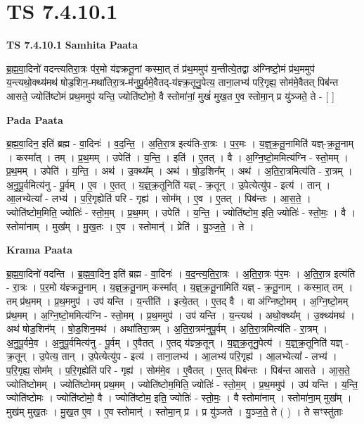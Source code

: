 \documentclass[17pt]{extarticle}
\begin{document}
\section{ TS 7.4.10.1 }

\textbf{TS 7.4.10.1 } \newline
\textbf{Samhita Paata} \newline

ब्र॒ह्म॒वा॒दिनो॑ वदन्त्यतिरा॒त्रः प॑र॒मो य॑ज्ञ्क्रतू॒नां कस्मा॒त् तं प्र॑थ॒ममुप॑ य॒न्तीत्ये॒तद्वा अ॑ग्निष्टो॒मं प्र॑थ॒ममुप॑ य॒न्त्यथो॒क्थ्य॑मथ॑ षोड॒शिन॒-मथा॑तिरा॒त्र-म॑नुपू॒र्वमे॒वैतद्-य॑ज्ञ्क्र॒तूनु॒पेत्य॒ ताना॒लभ्य॑ परि॒गृह्य॒ सोम॑मे॒वैतत् पिब॑न्त आसते॒ ज्योति॑ष्टोमं प्रथ॒ममुप॑ यन्ति॒ ज्योति॑ष्टोमो॒ वै स्तोमा॑नां॒ मुखं॑ मुख॒त ए॒व स्तोमा॒न् प्र यु॑ञ्जते॒ ते - [  ] \newline

\textbf{Pada Paata} \newline

ब्र॒ह्म॒वा॒दिन॒ इति॑ ब्रह्म - वा॒दिनः॑ । व॒द॒न्ति॒ । अ॒ति॒रा॒त्र इत्य॑ति-रा॒त्रः । प॒र॒मः । य॒ज्ञ्॒क्र॒तू॒नामिति॑ यज्ञ्-क्र॒तू॒नाम् । कस्मा᳚त् । तम् । प्र॒थ॒मम् । उपेति॑ । य॒न्ति॒ । इति॑ । ए॒तत् । वै । अ॒ग्नि॒ष्टो॒ममित्य॑ग्नि - स्तो॒मम् । प्र॒थ॒मम् । उपेति॑ । य॒न्ति॒ । अथ॑ । उ॒क्थ्य᳚म् । अथ॑ । षो॒ड॒शिन᳚म् । अथ॑ । अ॒ति॒रा॒त्रमित्य॑ति - रा॒त्रम् । अ॒नु॒पू॒र्वमित्य॑नु - पू॒र्वम् । ए॒व । ए॒तत् । य॒ज्ञ्॒क्र॒तूनिति॑ यज्ञ् - क्र॒तून् । उ॒पेत्येत्यु॑प - इत्य॑ । तान् । आ॒लभ्येत्या᳚ - लभ्य॑ । प॒रि॒गृह्येति॑ परि - गृह्य॑ । सोम᳚म् । ए॒व । ए॒तत् । पिब॑न्तः । आ॒स॒ते॒ । ज्योति॑ष्टोम॒मिति॒ ज्योतिः॑ - स्तो॒म॒म् । प्र॒थ॒मम् । उपेति॑ । य॒न्ति॒ । ज्योति॑ष्टोम॒ इति॒ ज्योतिः॑ - स्तो॒मः॒ । वै । स्तोमा॑नाम् । मुख᳚म् । मु॒ख॒तः । ए॒व । स्तोमान्॑ । प्रेति॑ । यु॒ञ्ज॒ते॒ । ते ।  \newline


\textbf{Krama Paata} \newline

ब्र॒ह्म॒वा॒दिनो॑ वदन्ति । ब्र॒ह्म॒वा॒दिन॒ इति॑ ब्रह्म - वा॒दिनः॑ । व॒द॒न्त्य॒ति॒रा॒त्रः । अ॒ति॒रा॒त्रः प॑र॒मः । अ॒ति॒रा॒त्र इत्य॑ति - रा॒त्रः । प॒र॒मो य॑ज्ञ्क्रतू॒नाम् । य॒ज्ञ्॒क्र॒तू॒नाम् कस्मा᳚त् । य॒ज्ञ्॒क्र॒तू॒नामिति॑ यज्ञ् - क्र॒तू॒नाम् । कस्मा॒त् तम् । तम् प्र॑थ॒मम् । प्र॒थ॒ममुप॑ । उप॑ यन्ति । य॒न्तीति॑ । इत्ये॒तत् । ए॒तद् वै । वा अ॑ग्निष्टो॒मम् । अ॒ग्नि॒ष्टो॒मम् प्र॑थ॒मम् । अ॒ग्नि॒ष्टो॒ममित्य॑ग्नि - स्तो॒मम् । प्र॒थ॒ममुप॑ । उप॑ यन्ति । य॒न्त्यथ॑ । अथो॒क्थ्य᳚म् । उ॒क्थ्य॑मथ॑ । अथ॑ षोड॒शिन᳚म् । षो॒ड॒शिन॒मथ॑ । अथा॑तिरा॒त्रम् । अ॒ति॒रा॒त्रम॑नुपू॒र्वम् । अ॒ति॒रा॒त्रमित्य॑ति - रा॒त्रम् । अ॒नु॒पू॒र्वमे॒व । अ॒नु॒पू॒र्वमित्य॑नु - पू॒र्वम् । ए॒वैतत् । ए॒तद् य॑ज्ञ्क्र॒तून् । य॒ज्ञ्॒क्र॒तूनु॒पेत्य॑ । य॒ज्ञ्॒क्र॒तूनिति॑ यज्ञ् - क्र॒तून् । उ॒पेत्य॒ तान् । उ॒पेत्येत्यु॑प - इत्य॑ । ताना॒लभ्य॑ । आ॒लभ्य॑ परि॒गृह्य॑ । आ॒लभ्येत्या᳚ - लभ्य॑ । प॒रि॒गृह्य॒ सोम᳚म् । प॒रि॒गृह्येति॑ परि - गृह्य॑ । सोम॑मे॒व । ए॒वैतत् । ए॒तत् पिब॑न्तः । पिब॑न्त आसते । आ॒स॒ते॒ ज्योति॑ष्टोमम् । ज्योति॑ष्टोमम् प्रथ॒मम् । ज्योति॑ष्टोम॒मिति॒ ज्योतिः॑ - स्तो॒म॒म् । प्र॒थ॒ममुप॑ । उप॑ यन्ति । य॒न्ति॒ ज्योति॑ष्टोमः । ज्योति॑ष्टोमो॒ वै । ज्योति॑ष्टोम॒ इति॒ ज्योतिः॑ - स्तो॒मः॒ । वै स्तोमा॑नाम् । स्तोमा॑ना॒म् मुख᳚म् । मुख॑म् मुख॒तः । मु॒ख॒त ए॒व । ए॒व स्तोमान्॑ । स्तोमा॒न् प्र । प्र यु॑ञ्जते । यु॒ञ्ज॒ते॒ ते ( ) । ते सꣳस्तु॑ताः \newline
\end{document}
